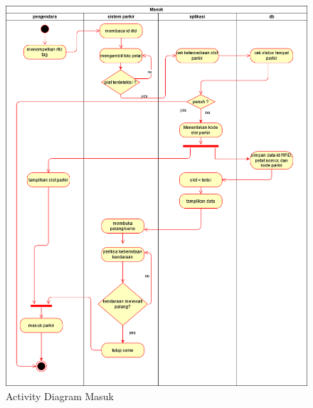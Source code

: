 \begin{figure} [H]
    \includegraphics[width=1\textwidth, center]{images/activity diagram skripsi masuk.png}
    \caption{Activity Diagram Masuk}
    \label{fig:diagrammasuk}
\end{figure}

